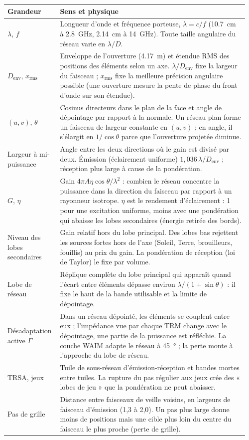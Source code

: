 \documentclass[11pt,a4paper]{article}
\newcommand{\Denv}{D_{\mathrm{env}}}
\begin{document}
{\small
\begin{longtable}{@{}p{0.2\linewidth}p{0.76\linewidth}@{}}
\toprule
Grandeur & Sens et physique\\
\midrule
\endhead
$\lambda$, $f$ & Longueur d'onde et fréquence porteuse, $\lambda = c/f$ (\SI{10.7}{cm} à \SI{2.8}{GHz}, \SI{2.14}{cm} à
\SI{14}{GHz}). Toute taille angulaire du réseau varie en $\lambda/D$.\\
$\Denv$, $x_{\mathrm{rms}}$ & Enveloppe de l'ouverture (\SI{4.17}{m}) et étendue RMS des positions des éléments selon un
axe. $\lambda/\Denv$ fixe la largeur du faisceau ; $x_{\mathrm{rms}}$ fixe la meilleure précision angulaire possible
(une ouverture mesure la pente de phase du front d'onde sur son étendue).\\
$(u, v)$, $\theta$ & Cosinus directeurs dans le plan de la face et angle de dépointage par rapport à la normale. Un
réseau plan forme un faisceau de largeur constante en $(u,v)$ ; en angle, il s'élargit en $1/\cos\theta$ parce que
l'ouverture projetée diminue.\\
Largeur à mi-puissance & Angle entre les deux directions où le gain est divisé par deux. Émission (éclairement
uniforme) $1,036\,\lambda/\Denv$ ; réception plus large à cause de la pondération.\\
$G$, $\eta$ & Gain $4\pi A\eta\cos\theta/\lambda^2$ : combien le réseau concentre la puissance dans la direction du
faisceau par rapport à un rayonneur isotrope. $\eta$ est le rendement d'éclairement : 1 pour une excitation uniforme,
moins avec une pondération qui abaisse les lobes secondaires (énergie retirée des bords).\\
Niveau des lobes secondaires & Gain relatif hors du lobe principal. Des lobes bas rejettent les sources fortes hors de
l'axe (Soleil, Terre, brouilleurs, fouillis) au prix du gain. La pondération de réception (loi de Taylor) le fixe par
volume.\\
Lobe de réseau & Réplique complète du lobe principal qui apparaît quand l'écart entre éléments dépasse environ
$\lambda/(1+\sin\theta)$ : il fixe le haut de la bande utilisable et la limite de dépointage.\\
Désadaptation active $\Gamma$ & Dans un réseau dépointé, les éléments se couplent entre eux ; l'impédance vue par chaque
TRM change avec le dépointage, une partie de la puissance est réfléchie. La couche WAIM adapte le réseau à
\SI{45}{\degree} ; la perte monte à l'approche du lobe de réseau.\\
TRSA, jeux & Tuile de sous-réseau d'émission-réception et bandes mortes entre tuiles. La rupture du pas régulier aux
jeux crée des « lobes de jeu » que la pondération ne peut abaisser.\\
Pas de grille & Distance entre faisceaux de veille voisins, en largeurs de faisceau d'émission (1,3 à 2,0). Un pas plus
large donne moins de positions mais une cible plus loin du centre du faisceau le plus proche (perte de grille).\\
\bottomrule
\end{longtable}}
\end{document}

